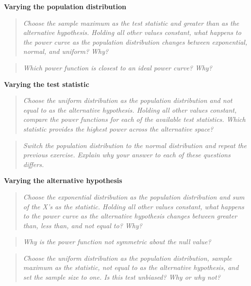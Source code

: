 \documentclass{TISE}
\begin{document}
\textbf{Varying the population distribution}

\begin{quote}
	\textit{Choose the sample maximum as the test statistic and greater than as the alternative hypothesis. Holding all other values constant, what happens to the power curve as the population distribution changes between exponential, normal, and uniform? Why?}
\end{quote}

\begin{quote}
	\textit{Which power function is closest to an ideal power curve? Why?}
\end{quote}

\textbf{Varying the test statistic}

\begin{quote}
	\textit{Choose the uniform distribution as the population distribution and not equal to as the alternative hypothesis. Holding all other values constant, compare the power functions for each of the available test statistics. Which statistic provides the highest power across the alternative space?}
\end{quote}

\begin{quote}
	\textit{Switch the population distribution to the normal distribution and repeat the previous exercise. Explain why your answer to each of these questions differs.}
\end{quote}

\textbf{Varying the alternative hypothesis}

\begin{quote}
	\textit{Choose the exponential distribution as the population distribution and sum of the X's as the statistic. Holding all other values constant, what happens to the power curve as the alternative hypothesis changes between greater than, less than, and not equal to? Why?}
\end{quote}

\begin{quote}
	\textit{Why is the power function not symmetric about the null value?}
\end{quote}

\begin{quote}
	\textit{Choose the uniform distribution as the population distribution, sample maximum as the statistic, not equal to as the alternative hypothesis, and set the sample size to one. Is this test unbiased? Why or why not?}
\end{quote}
\end{document}
